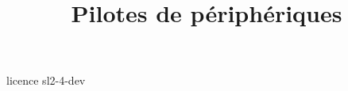 \documentclass [xcolor=table] {beamer}
\title {Pilotes de périphériques}
\begin{document}
 {licence}
 {sl2-4-dev}
\end{document}
